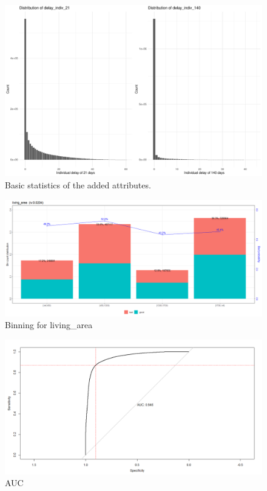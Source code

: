 \documentclass[
]{article}
\begin{document}
\begin{figure}
\includegraphics[height=0.4\textheight]{Documentation_Rmarkdown_files/figure-latex/statIndiv-1} \caption{\label{fig:stat-new}Basic statistics of the added attributes.}\label{fig:statIndiv}
\end{figure}

\begin{figure}
\centering
\includegraphics{.//WOE21.png}
\caption{\label{fig:woe21} Binning for living\_area}
\end{figure}

\begin{figure}
\centering
\includegraphics{.//AUC21.png}
\caption{\label{fig:auc21} AUC}
\end{figure}
\end{document}
